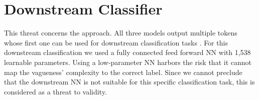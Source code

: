 \section{Downstream Classifier}
\label{chp:threats_to_validity:sec:downstream_classifier}

This threat concerns the approach.
All three models output multiple tokens whose first one can be used for downstream classification tasks \parencite{Devlin:2018}.
For this downstream classification we used a fully connected feed forward \ac{NN} with 1,538 learnable parameters.
Using a low-parameter \ac{NN} harbors the risk that it cannot map the vagueness' complexity to the correct label.
Since we cannot preclude that the downstream \ac{NN} is not suitable for this specific classification task, this is considered as a threat to validity.
